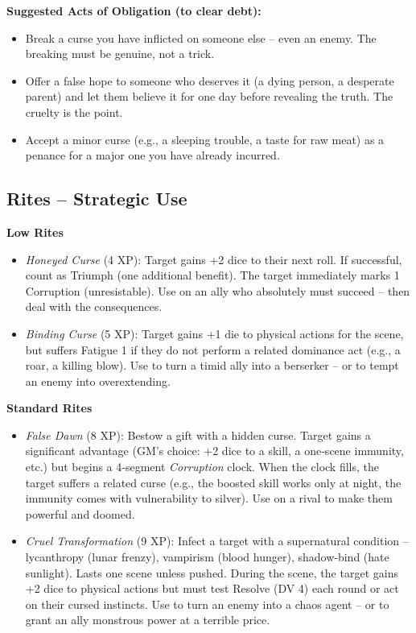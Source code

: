 \documentclass[10pt,a5paper]{book}
\begin{document}
\textbf{Suggested Acts of Obligation (to clear debt):}
\begin{itemize}
    \item Break a curse you have inflicted on someone else – even an enemy. The breaking must be genuine, not a trick.
    \item Offer a false hope to someone who deserves it (a dying person, a desperate parent) and let them believe it for one day before revealing the truth. The cruelty is the point.
    \item Accept a minor curse (e.g., a sleeping trouble, a taste for raw meat) as a penance for a major one you have already incurred.
\end{itemize}

\subsection*{Rites – Strategic Use}

\textbf{Low Rites}
\begin{itemize}
    \item \textit{Honeyed Curse} (4 XP): Target gains +2 dice to their next roll. If successful, count as Triumph (one additional benefit). The target immediately marks 1 Corruption (unresistable). Use on an ally who absolutely must succeed – then deal with the consequences.
    \item \textit{Binding Curse} (5 XP): Target gains +1 die to physical actions for the scene, but suffers Fatigue 1 if they do not perform a related dominance act (e.g., a roar, a killing blow). Use to turn a timid ally into a berserker – or to tempt an enemy into overextending.
\end{itemize}

\textbf{Standard Rites}
\begin{itemize}
    \item \textit{False Dawn} (8 XP): Bestow a gift with a hidden curse. Target gains a significant advantage (GM’s choice: +2 dice to a skill, a one‑scene immunity, etc.) but begins a 4‑segment \textit{Corruption} clock. When the clock fills, the target suffers a related curse (e.g., the boosted skill works only at night, the immunity comes with vulnerability to silver). Use on a rival to make them powerful and doomed.
    \item \textit{Cruel Transformation} (9 XP): Infect a target with a supernatural condition – lycanthropy (lunar frenzy), vampirism (blood hunger), shadow‑bind (hate sunlight). Lasts one scene unless pushed. During the scene, the target gains +2 dice to physical actions but must test Resolve (DV 4) each round or act on their cursed instincts. Use to turn an enemy into a chaos agent – or to grant an ally monstrous power at a terrible price.
\end{itemize}
\end{document}
